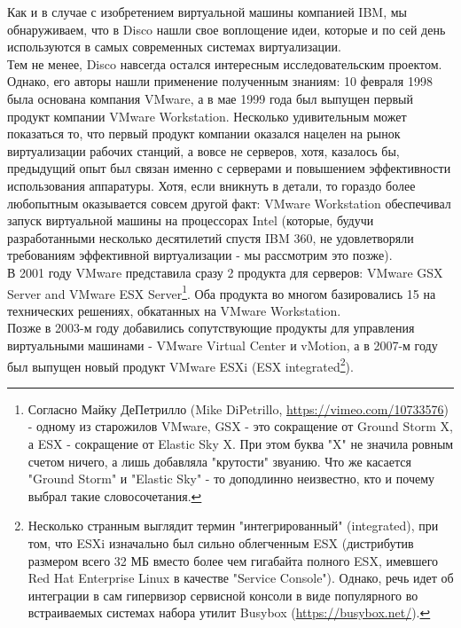 \documentclass[14pt, a4paper]{article}
\begin{document}
Как и в случае с изобретением виртуальной машины компанией IBM, мы
обнаруживаем, что в Disco нашли свое воплощение идеи, которые и по сей день
используются в самых современных системах виртуализации.\\

Тем не менее, Disco навсегда остался интересным исследовательским проектом.
Однако, его авторы нашли применение полученным знаниям: 10 февраля 1998 была
основана компания VMware, а в мае 1999 года был выпущен первый продукт компании
VMware Workstation. Несколько удивительным может показаться то, что первый
продукт компании оказался нацелен на рынок виртуализации рабочих станций, а вовсе
не серверов, хотя, казалось бы, предыдущий опыт был связан именно с серверами и
повышением эффективности использования аппаратуры. Хотя, если вникнуть в
детали, то гораздо более любопытным оказывается совсем другой факт: VMware
Workstation обеспечивал запуск виртуальной машины на процессорах Intel (которые,
будучи разработанными несколько десятилетий спустя IBM 360, не удовлетворяли
требованиям эффективной виртуализации - мы рассмотрим это позже).\\

В 2001 году VMware представила сразу 2 продукта для серверов: VMware GSX Server
and VMware ESX Server\footnote{Согласно Майку ДеПетрилло (Mike DiPetrillo, \href{https://vimeo.com/10733576}{https://vimeo.com/10733576}) - одному из
старожилов VMware, GSX - это сокращение от Ground Storm X, а ESX - сокращение от Elastic
Sky X. При этом буква "X" не значила ровным счетом ничего, а лишь добавляла "крутости"
звуанию. Что же касается "Ground Storm" и "Elastic Sky" - то доподлинно неизвестно, кто и
почему выбрал такие словосочетания.}. Оба продукта во многом базировались 15 на технических
решениях, обкатанных на VMware Workstation.\\

Позже в 2003-м году добавились сопутствующие продукты для управления
виртуальными машинами - VMware Virtual Center и vMotion, а в 2007-м году был
выпущен новый продукт VMware ESXi (ESX integrated\footnote{Несколько странным выглядит термин "интегрированный" (integrated), при том, что ESXi
изначально был сильно облегченным ESX (дистрибутив размером всего 32 МБ вместо более
чем гигабайта полного ESX, имевшего Red Hat Enterprise Linux в качестве "Service Console").
Однако, речь идет об интеграции в сам гипервизор сервисной консоли в виде популярного во
встраиваемых системах набора утилит Busybox (\href{https://busybox.net/}{https://busybox.net/}).}).\\
\end{document}
